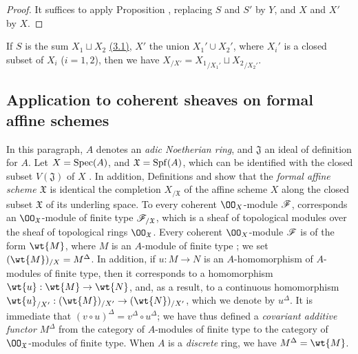 \begin{proof}
\label{proof-1.10.9.9}
It suffices to apply Proposition , replacing $S$ and $S'$ by $Y$, and $X$ and $X'$ by $X$.
\end{proof}

\begin{rmk}[10.9.10]
\label{1.10.9.10}
If $S$ is the sum $X_1\sqcup X_2$ \hyperref[subsection:1.3.1]{(3.1)}, $X'$ the union $X_1'\cup X_2'$, where $X_i'$ is a closed subset of $X_i$ ($i=1,2$), then we have $X_{/X'}={X_1}_{/X_1'}\sqcup{X_2}_{/X_2'}$.
\end{rmk}

\subsection{Application to coherent sheaves on formal affine schemes}
\label{subsection:1.10.10}

\begin{env}[10.10.1]
\label{1.10.10.1}
In this paragraph, $A$ denotes an \emph{adic Noetherian ring}, and $\mathfrak{J}$ an ideal of definition for $A$.
Let $X=\operatorname{Spec}(A)$, and $\mathfrak{X}=\operatorname{Spf}(A)$, which can be identified with the closed subset $V(\mathfrak{J})$ of $X$ .
In addition, Definitions  and  show that the \emph{formal affine scheme $\mathfrak{X}$} is identical the completion $X_{/\mathfrak{X}}$ of the affine scheme $X$ along the closed subset $\mathfrak{X}$ of its underling space.
To every coherent $\OO_X$-module $\mathscr{F}$, corresponds an $\OO_\mathfrak{X}$-module of finite type $\mathscr{F}_{/\mathfrak{X}}$, which is a sheaf of topological modules over the sheaf of topological rings $\OO_\mathfrak{X}$.
Every coherent $\OO_X$-module $\mathscr{F}$ is of the form $\wt{M}$, where $M$ is an $A$-module of finite type ; we set $(\wt{M})_{/X}=M^\Delta$.
In addition, if $u:M\to N$ is an $A$-homomorphism of $A$-modules of finite type, then it corresponds to a homomorphism $\wt{u}:\wt{M}\to\wt{N}$, and, as a result, to a continuous homomorphism $\wt{u}_{/X'}:(\wt{M})_{/X'}\to(\wt{N})_{/X'}$, which we denote by $u^\Delta$.
It is immediate that $(v\circ u)^\Delta=v^\Delta\circ u^\Delta$; we have thus defined a \emph{covariant additive functor $M^\Delta$} from the category of $A$-modules of finite type to the category of $\OO_\mathfrak{X}$-modules of finite type.
When $A$ is a \emph{discrete} ring, we have $M^\Delta=\wt{M}$.
\end{env}

